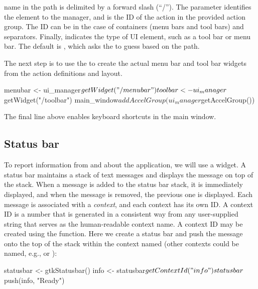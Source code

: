 \documentclass[article,shortnames]{jss}
\begin{document}
name in the path is delimited by a forward slash (``/''). The
 parameter identifies the element to the manager, and
 is the ID of the action in the provided action group.
The ID can be  in the case of containers (menu bars and
tool bars) and separators. Finally,  indicates the type of
UI element, such as a tool bar or menu bar. The default is
, which asks the  to guess based on the
path.

The next step is to use the  to create the actual
menu bar and tool bar widgets from the action definitions and layout.
\begin{Code}
menubar <- ui_manager$getWidget("/menubar")
toolbar <- ui_manager$getWidget("/toolbar")
main_window$addAccelGroup(ui_manager$getAccelGroup()) 
\end{Code}
The final line above enables keyboard shortcuts in the main window.

\subsection{Status bar}

To report information from and about the application, we will use a
 widget.  A status bar maintains a 
stack of text messages and displays the message on top of the
stack. When a message is added to the status bar stack, it is
immediately displayed, and when the message is removed, the previous
one is displayed.
Each message is associated with a \emph{context}, and each context has
its own ID. A context ID is a number that is generated in a consistent
way from any user-supplied string that serves as the human-readable
context name.  A context ID may be created using the
 function.
Here we create a status bar and push the message  onto
the top of the stack within the context named  (other
contexts could be named, e.g.,
 or ):
\begin{Code}
statusbar <- gtkStatusbar()
info <- statusbar$getContextId("info")
statusbar$push(info, "Ready") 
\end{Code}
\end{document}
